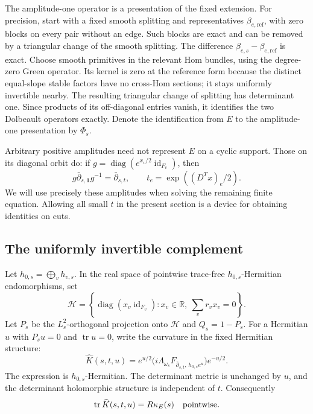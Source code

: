 \documentclass[11pt]{amsart}
\theoremstyle{definition}
\theoremstyle{remark}
\newcommand{\db}{\bar\partial}
\newcommand{\tr}{\operatorname{tr}}
\newcommand{\diag}{\operatorname{diag}}
\newcommand{\id}{\operatorname{id}}
\newcommand{\RR}{\mathbb R}
\newcommand{\HH}{\mathcal H}
\newcommand{\one}{\mathbf 1}
\begin{document}
The amplitude-one operator is a presentation of the fixed extension.
For precision, start with a fixed smooth splitting and representatives
\(\beta_{e,\mathrm{ref}}\), with zero blocks on every pair without
an edge. Such blocks are exact and can be removed by a triangular
change of the smooth splitting. The difference
\(\beta_{e,s}-\beta_{e,\mathrm{ref}}\) is exact. Choose smooth
primitives in the relevant Hom bundles, using the degree-zero
Green operator. Its kernel is zero at the reference form because
the distinct equal-slope stable factors have no cross-Hom
sections; it stays uniformly invertible nearby. The resulting
triangular change of splitting has determinant one. Since products
of its off-diagonal entries vanish, it identifies the two
Dolbeault operators exactly. Denote the identification from \(E\)
to the amplitude-one presentation by \(\Phi_s\).

Arbitrary positive amplitudes need not represent \(E\) on a
cyclic support. Those on its diagonal orbit do:
if \(g=\diag(e^{x_v/2}\id_{F_v})\), then
\begin{equation}\label{eq03:orbit}
 g\db_{s,\one}g^{-1}=\db_{s,t},
 \qquad t_e=\exp((D^Tx)_e/2).
\end{equation}
We will use precisely these amplitudes when solving the remaining
finite equation. Allowing all small \(t\) in the present section
is a device for obtaining identities on cuts.

\subsection{The uniformly invertible complement}

Let \(h_{0,s}=\bigoplus_vh_{v,s}\). In the real space of
pointwise trace-free \(h_{0,s}\)-Hermitian endomorphisms, set
\[
 \HH=\left\{\diag(x_v\id_{F_v}):x_v\in\RR,\
                    \sum_vr_vx_v=0\right\}.
\]
Let \(P_s\) be the \(L^2_s\)-orthogonal projection onto \(\HH\)
and \(Q_s=1-P_s\). For a Hermitian \(u\) with \(P_su=0\) and
\(\tr u=0\), write the curvature in the fixed Hermitian structure:
\begin{equation}\label{eq03:centeredcurvature}
 \widehat K(s,t,u)
 =e^{u/2}
 \bigl(i\Lambda_{\omega_s}F_{\db_{s,t},\,h_{0,s}e^u}\bigr)e^{-u/2}.
\end{equation}
The expression is \(h_{0,s}\)-Hermitian. The determinant metric is
unchanged by \(u\), and the determinant holomorphic structure is
independent of \(t\). Consequently
\[
 \tr\widehat K(s,t,u)=R\kappa_E(s)
 \quad\hbox{pointwise}.
\]
\end{document}
